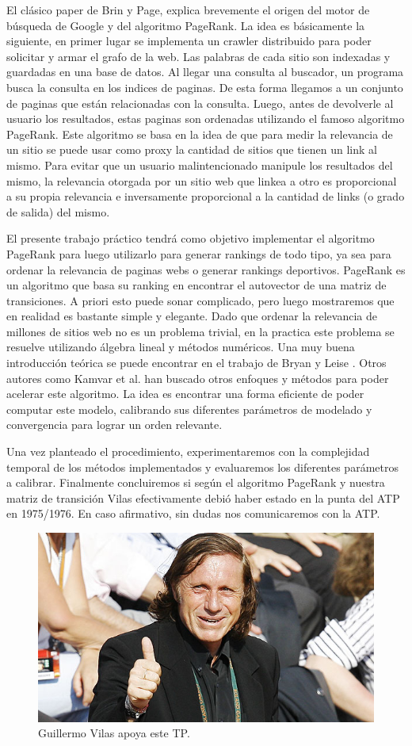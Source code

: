 El clásico paper de Brin y Page,  \cite{Brin1998} explica brevemente el origen del motor de búsqueda de Google y del algoritmo PageRank. La idea es básicamente la siguiente, en primer lugar se implementa un crawler distribuido para poder solicitar y armar el grafo de la web. Las palabras de cada sitio son indexadas y guardadas en una base de datos. Al llegar una consulta al buscador, un programa busca la consulta en los indices de paginas. De esta forma llegamos a un conjunto de paginas que están relacionadas con la consulta. Luego, antes de devolverle al usuario los resultados, estas paginas son ordenadas utilizando el famoso algoritmo PageRank. Este algoritmo se basa en la idea de que para medir la relevancia de un sitio se puede usar como proxy la cantidad de sitios que tienen un link al mismo. Para evitar que un usuario malintencionado manipule los resultados del mismo, la relevancia otorgada por un sitio web que linkea a otro es proporcional a su propia relevancia e inversamente proporcional a la cantidad de links (o grado de salida) del mismo.

El presente trabajo práctico tendrá como objetivo implementar el algoritmo PageRank para luego utilizarlo para generar rankings de todo tipo, ya sea para ordenar la relevancia de paginas webs o generar rankings deportivos. PageRank es un algoritmo que basa su ranking en encontrar el autovector de una matriz de transiciones. A priori esto puede sonar complicado, pero luego mostraremos que en realidad es bastante simple y elegante. Dado que ordenar la relevancia de millones de sitios web no es un problema trivial, en la practica este problema se resuelve utilizando álgebra lineal y métodos numéricos. Una muy buena introducción teórica se puede encontrar en el trabajo de Bryan y Leise \cite{Bryan2006}. Otros autores como Kamvar et al. \cite{Kamvar2003} han buscado otros enfoques y métodos para poder acelerar este algoritmo. La idea es encontrar una forma eficiente de poder computar este modelo, calibrando sus diferentes parámetros de modelado y convergencia para lograr un orden relevante. 

Una vez planteado el procedimiento, experimentaremos con la complejidad temporal de los métodos implementados y evaluaremos los diferentes parámetros a calibrar. Finalmente concluiremos si según el algoritmo PageRank y nuestra matriz de transición Vilas efectivamente debió haber estado en la punta del ATP en 1975/1976. En caso afirmativo, sin dudas nos comunicaremos con la ATP.

\begin{figure}[H]
  \centering
  \includegraphics[scale=0.5]{images/vilasaprueba}
  \caption{Guillermo Vilas apoya este TP.}
\end{figure}